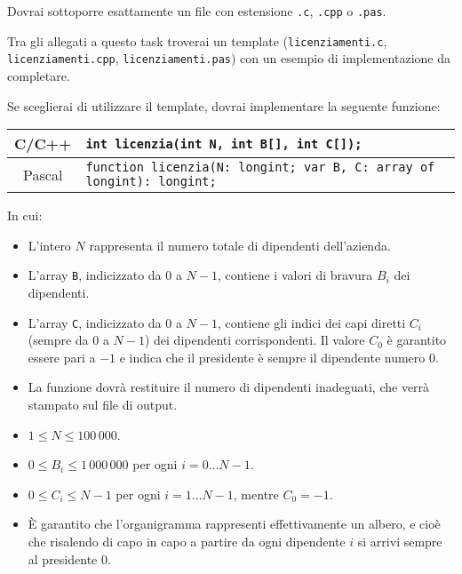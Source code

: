 \Implementation
Dovrai sottoporre esattamente un file con estensione \texttt{.c}, \texttt{.cpp} o \texttt{.pas}.

\begin{warning}
Tra gli allegati a questo task troverai un template (\texttt{licenziamenti.c}, \texttt{licenziamenti.cpp}, \texttt{licenziamenti.pas}) con un esempio di implementazione da completare.
\end{warning}

Se sceglierai di utilizzare il template, dovrai implementare la seguente funzione:
\begin{center}\begin{tabularx}{\textwidth}{|c|X|}
\hline
C/C++  & \verb|int licenzia(int N, int B[], int C[]);|\\
\hline
Pascal & \verb|function licenzia(N: longint; var B, C: array of longint): longint;|\\
\hline
\end{tabularx}\end{center}
In cui:
\begin{itemize}[nolistsep]
  \item L'intero $N$ rappresenta il numero totale di dipendenti dell'azienda.
  \item L'array \texttt{B}, indicizzato da $0$ a $N-1$, contiene i valori di bravura $B_i$ dei dipendenti.
  \item L'array \texttt{C}, indicizzato da $0$ a $N-1$, contiene gli indici dei capi diretti $C_i$ (sempre da 0 a $N-1$) dei dipendenti corrispondenti. Il valore $C_0$ è garantito essere pari a $-1$ e indica che il presidente è sempre il dipendente numero $0$.
  \item La funzione dovrà restituire il numero di dipendenti inadeguati, che verrà stampato sul file di output.
\end{itemize}

\Constraints
\begin{itemize}[nolistsep, itemsep=2mm]
	\item $1 \le N \le 100\,000$.
	\item $0 \le B_i \le 1\,000\,000$ per ogni $i=0\ldots N-1$.
	\item $0 \le C_i \le N-1$ per ogni $i=1\ldots N-1$, mentre $C_0 = -1$.
	\item \`E garantito che l'organigramma rappresenti effettivamente un albero, e cioè che risalendo di capo in capo a partire da ogni dipendente $i$ si arrivi sempre al presidente $0$.
\end{itemize}

